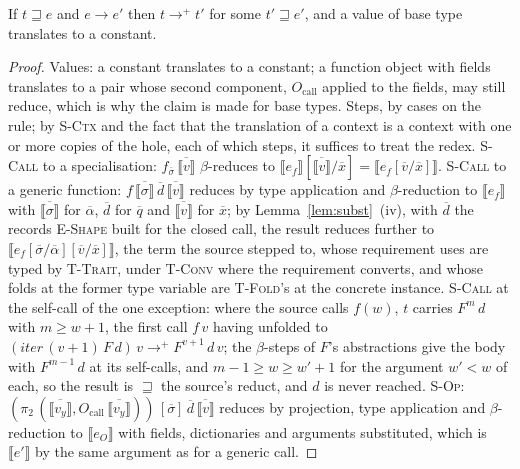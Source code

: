 \begin{lemma}
\label{lem:forward}
If $t \sqsupseteq e$ and $e \longrightarrow e'$ then $t \longrightarrow^{+} t'$ for some $t' \sqsupseteq e'$, and a value of base type translates to a constant.
\end{lemma}

\begin{proof}
Values: a constant translates to a constant; a function object with fields translates to a pair whose second component, $O_{\mathrm{call}}$ applied to the fields, may still reduce, which is why the claim is made for base types.
Steps, by cases on the rule; by \textsc{S-Ctx} and the fact that the translation of a context is a context with one or more copies of the hole, each of which steps, it suffices to treat the redex.
\textsc{S-Call} to a specialisation: $f_{\overline{\sigma}}\,\overline{\llbracket v \rrbracket}$ $\beta$-reduces to $\llbracket e_f \rrbracket[\overline{\llbracket v \rrbracket}/\overline{x}] = \llbracket e_f[\overline{v}/\overline{x}] \rrbracket$.
\textsc{S-Call} to a generic function: $f\,\overline{\llbracket \sigma \rrbracket}\,\overline{d}\,\overline{\llbracket v \rrbracket}$ reduces by type application and $\beta$-reduction to $\llbracket e_f \rrbracket$ with $\overline{\llbracket \sigma \rrbracket}$ for $\overline{\alpha}$, $\overline{d}$ for $\overline{q}$ and $\overline{\llbracket v \rrbracket}$ for $\overline{x}$; by Lemma~\ref{lem:subst}~(iv), with $\overline{d}$ the records \textsc{E-Shape} built for the closed call, the result reduces further to $\llbracket e_f[\overline{\sigma}/\overline{\alpha}][\overline{v}/\overline{x}] \rrbracket$, the term the source stepped to, whose requirement uses are typed by \textsc{T-Trait}, under \textsc{T-Conv} where the requirement converts, and whose folds at the former type variable are \textsc{T-Fold}'s at the concrete instance.
\textsc{S-Call} at the self-call of the one exception: where the source calls $f(w)$, $t$ carries $F^{m}\,d$ with $m \geq w + 1$, the first call $f\,v$ having unfolded to $(\mathit{iter}\,(v{+}1)\,F\,d)\,v \longrightarrow^{+} F^{v+1}\,d\,v$; the $\beta$-steps of $F$'s abstractions give the body with $F^{m-1}\,d$ at its self-calls, and $m - 1 \geq w \geq w' + 1$ for the argument $w' < w$ of each, so the result is $\sqsupseteq$ the source's reduct, and $d$ is never reached.
\textsc{S-Op}: $(\pi_2\,(\overline{\llbracket v_y \rrbracket}, O_{\mathrm{call}}\,\overline{\llbracket v_y \rrbracket}))\,[\overline{\sigma}]\,\overline{d}\,\overline{\llbracket v \rrbracket}$ reduces by projection, type application and $\beta$-reduction to $\llbracket e_O \rrbracket$ with fields, dictionaries and arguments substituted, which is $\llbracket e' \rrbracket$ by the same argument as for a generic call.

\end{proof}
